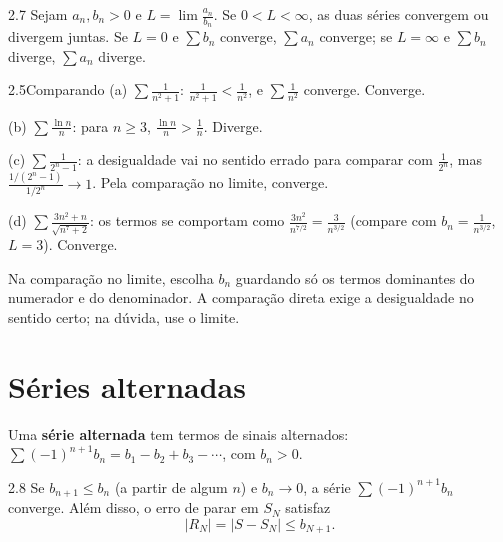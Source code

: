 \begin{teorema}{2.7}
Sejam $a_n,b_n>0$ e $L=\lim\frac{a_n}{b_n}$. Se
$0<L<\infty$, as duas séries convergem ou divergem juntas. Se $L=0$ e $\sum b_n$ converge,
$\sum a_n$ converge; se $L=\infty$ e $\sum b_n$ diverge, $\sum a_n$ diverge.
\end{teorema}

\begin{exemplo}{2.5}{Comparando}
(a) $\sum\frac1{n^2+1}$: $\frac1{n^2+1}<\frac1{n^2}$, e $\sum\frac1{n^2}$ converge. Converge.

(b) $\sum\frac{\ln n}{n}$: para $n\ge3$, $\frac{\ln n}n>\frac1n$. Diverge.

(c) $\sum\frac1{2^n-1}$: a desigualdade vai no sentido errado para comparar com
$\frac1{2^n}$, mas $\frac{1/(2^n-1)}{1/2^n}\to1$. Pela comparação no limite, converge.

(d) $\sum\frac{3n^2+n}{\sqrt{n^7+2}}$: os termos se comportam como $\frac{3n^2}{n^{7/2}}=\frac3{n^{3/2}}$
(compare com $b_n=\frac1{n^{3/2}}$, $L=3$). Converge.
\end{exemplo}

\begin{nota}
Na comparação no limite, escolha $b_n$ guardando só os termos dominantes do numerador e do
denominador. A comparação direta exige a desigualdade no sentido certo; na dúvida, use o limite.
\end{nota}

\section{Séries alternadas}

Uma \textbf{série alternada} tem termos de sinais alternados:
$\sum(-1)^{n+1}b_n=b_1-b_2+b_3-\cdots$, com $b_n>0$.

\begin{teorema}{2.8}
Se $b_{n+1}\le b_n$ (a partir de algum $n$) e $b_n\to0$, a série
$\sum(-1)^{n+1}b_n$ converge. Além disso, o erro de parar em $S_N$ satisfaz
\[
|R_N|=|S-S_N|\le b_{N+1}.
\]
\end{teorema}

